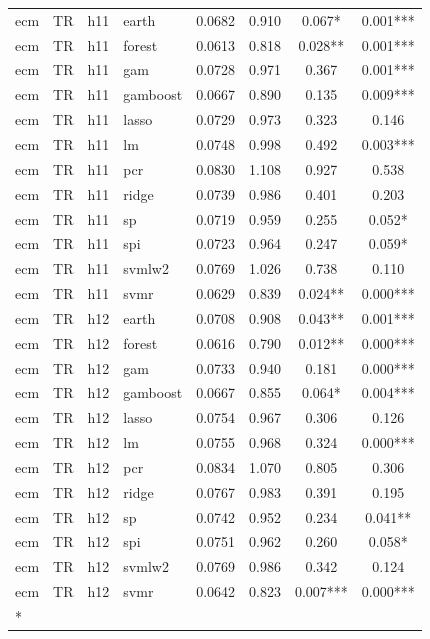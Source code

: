\begin{ThreePartTable}
\begin{longtable}[t]{llclcccc}
\addlinespace
ecm & TR & h11 & earth & 0.0682 & 0.910 & 0.067* & 0.001***\\
ecm & TR & h11 & forest & 0.0613 & 0.818 & 0.028** & 0.001***\\
ecm & TR & h11 & gam & 0.0728 & 0.971 & 0.367 & 0.001***\\
ecm & TR & h11 & gamboost & 0.0667 & 0.890 & 0.135 & 0.009***\\
ecm & TR & h11 & lasso & 0.0729 & 0.973 & 0.323 & 0.146\\
ecm & TR & h11 & lm & 0.0748 & 0.998 & 0.492 & 0.003***\\
ecm & TR & h11 & pcr & 0.0830 & 1.108 & 0.927 & 0.538\\
ecm & TR & h11 & ridge & 0.0739 & 0.986 & 0.401 & 0.203\\
ecm & TR & h11 & sp & 0.0719 & 0.959 & 0.255 & 0.052*\\
ecm & TR & h11 & spi & 0.0723 & 0.964 & 0.247 & 0.059*\\
ecm & TR & h11 & svmlw2 & 0.0769 & 1.026 & 0.738 & 0.110\\
ecm & TR & h11 & svmr & 0.0629 & 0.839 & 0.024** & 0.000***\\
\addlinespace
ecm & TR & h12 & earth & 0.0708 & 0.908 & 0.043** & 0.001***\\
ecm & TR & h12 & forest & 0.0616 & 0.790 & 0.012** & 0.000***\\
ecm & TR & h12 & gam & 0.0733 & 0.940 & 0.181 & 0.000***\\
ecm & TR & h12 & gamboost & 0.0667 & 0.855 & 0.064* & 0.004***\\
ecm & TR & h12 & lasso & 0.0754 & 0.967 & 0.306 & 0.126\\
ecm & TR & h12 & lm & 0.0755 & 0.968 & 0.324 & 0.000***\\
ecm & TR & h12 & pcr & 0.0834 & 1.070 & 0.805 & 0.306\\
ecm & TR & h12 & ridge & 0.0767 & 0.983 & 0.391 & 0.195\\
ecm & TR & h12 & sp & 0.0742 & 0.952 & 0.234 & 0.041**\\
ecm & TR & h12 & spi & 0.0751 & 0.962 & 0.260 & 0.058*\\
ecm & TR & h12 & svmlw2 & 0.0769 & 0.986 & 0.342 & 0.124\\
ecm & TR & h12 & svmr & 0.0642 & 0.823 & 0.007*** & 0.000***\\*
\end{longtable}
\end{ThreePartTable}
\endgroup{}
